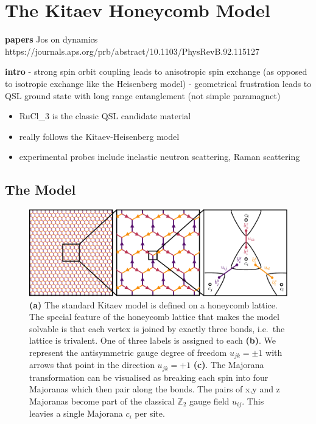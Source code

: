 \hypertarget{the-kitaev-honeycomb-model}{%
\section{The Kitaev Honeycomb Model}\label{the-kitaev-honeycomb-model}}

\textbf{papers} Jos on dynamics https://journals.aps.org/prb/abstract/10.1103/PhysRevB.92.115127

\textbf{intro} - strong spin orbit coupling leads to anisotropic spin exchange (as opposed to isotropic exchange like the Heisenberg model) - geometrical frustration leads to QSL ground state with long range entanglement (not simple paramagnet)

\begin{itemize}
\tightlist
\item
  RuCl\_3 is the classic QSL candidate material
\item
  really follows the Kitaev-Heisenberg model
\item
  experimental probes include inelastic neutron scattering, Raman scattering
\end{itemize}

\hypertarget{bg-hkm-model}{%
\subsection{The Model}\label{bg-hkm-model}}

\hypertarget{fig:intro_figure_by_hand}{%
\begin{figure}
\centering
\includegraphics[width=1\textwidth,height=\textheight]{figure_code/amk_chapter/intro/honeycomb_zoom/intro_figure_by_hand}
\caption[{The Kitaev Honeycomb Model}]{\textbf{(a)} The standard Kitaev model is defined on a honeycomb lattice. The special feature of the honeycomb lattice that makes the model solvable is that each vertex is joined by exactly three bonds, i.e.~the lattice is trivalent. One of three labels is assigned to each \textbf{(b)}. We represent the antisymmetric gauge degree of freedom \(u_{jk} = \pm 1\) with arrows that point in the direction \(u_{jk} = +1\) \textbf{(c)}. The Majorana transformation can be visualised as breaking each spin into four Majoranas which then pair along the bonds. The pairs of x,y and z Majoranas become part of the classical \(\mathbb{Z}_2\) gauge field \(u_{ij}\). This leavies a single Majorana \(c_i\) per site.}
\label{fig:intro_figure_by_hand}
\end{figure}
}


